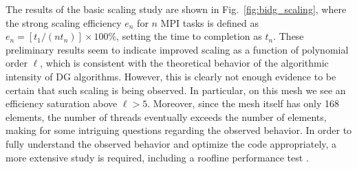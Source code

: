 The results of the basic scaling study are shown in
Fig.~\ref{fig:bidg_scaling}, where the strong scaling efficiency $e_{n}$ for
$n$ MPI tasks is defined as $e_{n}= [t_{1}/(nt_{n})]\times 100\%$, setting the time to
completion as $t_n$. These preliminary results seem to indicate improved scaling as a function of polynomial order $\ell$, which is consistent with the theoretical
behavior of the algorithmic intensity of DG algorithms.  However, this is
clearly not enough evidence to be certain that such scaling is being observed.
In particular, on this mesh we see an efficiency saturation above $\ell>5$.
Moreover, since the mesh itself has only 168 elements, the number of threads
eventually exceeds the number of elements, making for some intriguing questions
regarding the observed behavior.  In order to fully understand the observed behavior and
optimize the code appropriately, a more extensive study is required, including
%
a roofline performance test
\cite{Williams:2009:RIV:1498765.1498785}.

%
%




